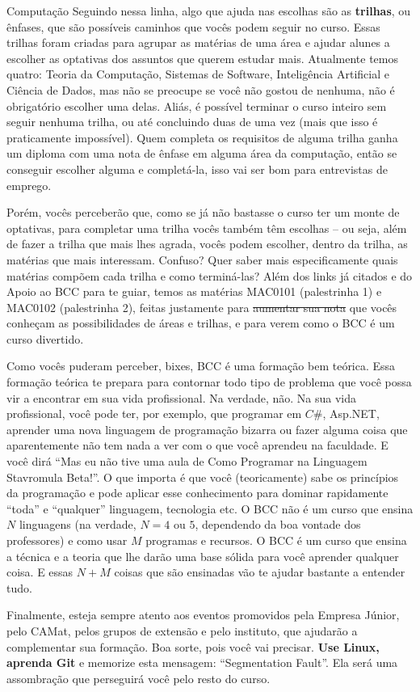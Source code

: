 \begin{subsecao}{Computação}
Seguindo nessa linha, algo que ajuda nas escolhas são as \textbf{trilhas}, ou
ênfases, que são possíveis caminhos que vocês podem seguir no curso. Essas
trilhas foram criadas para agrupar as matérias de uma área e ajudar alunes a
escolher as optativas dos assuntos que querem estudar mais. Atualmente temos
quatro: Teoria da Computação, Sistemas de Software, Inteligência Artificial e
Ciência de Dados, mas não se preocupe se você não gostou de nenhuma, não é
obrigatório escolher uma delas. Aliás, é possível terminar o curso inteiro sem
seguir nenhuma trilha, ou até concluindo duas de uma vez (mais que isso é
praticamente impossível). Quem completa os requisitos de alguma trilha ganha
um diploma com uma nota de ênfase em alguma área da computação, então se
conseguir escolher alguma e completá-la, isso vai ser bom para entrevistas de
emprego.

Porém, vocês perceberão que, como se já não bastasse o curso ter um monte de
optativas, para completar uma trilha vocês também têm escolhas -- ou seja,
além de fazer a trilha que mais lhes agrada, vocês podem escolher, dentro da
trilha, as matérias que mais interessam. Confuso? Quer saber mais
especificamente quais matérias compõem cada trilha e como terminá-las? Além
dos links já citados e do Apoio ao BCC para te guiar, temos as matérias MAC0101
(palestrinha 1) e MAC0102 (palestrinha 2), feitas justamente para
\sout{aumentar sua nota} que vocês conheçam as possibilidades de áreas e
trilhas, e para verem como o BCC é um curso divertido.

Como vocês puderam perceber, bixes, BCC é uma formação bem teórica. Essa
formação teórica te prepara para contornar todo tipo de problema que você
possa vir a encontrar em sua vida profissional. Na verdade, não. Na sua vida
profissional, você pode ter, por exemplo, que programar em $C\#$, Asp.NET,
aprender uma nova linguagem de programação bizarra ou fazer alguma coisa que
aparentemente não tem nada a ver com o que você aprendeu na faculdade. E você
dirá ``Mas eu não tive uma aula de Como Programar na Linguagem Stavromula
Beta!''. O que importa é que você (teoricamente) sabe os princípios da
programação e pode aplicar esse conhecimento para dominar rapidamente ``toda''
e ``qualquer'' linguagem, tecnologia etc. O BCC não é um curso que ensina $N$
linguagens (na verdade, $N = 4$ ou $5$, dependendo da boa vontade dos
professores) e como usar $M$ programas e recursos. O BCC é um curso que ensina
a técnica e a teoria que lhe darão uma base sólida para você aprender qualquer
coisa. E essas $N + M$ coisas que são ensinadas vão te ajudar bastante a
entender tudo.

Finalmente, esteja sempre atento aos eventos promovidos pela Empresa Júnior,
pelo CAMat, pelos grupos de extensão e pelo instituto, que ajudarão a
complementar sua formação. Boa sorte, pois você vai precisar. \textbf{Use
Linux, aprenda Git} e memorize esta mensagem: ``Segmentation Fault''. Ela será
uma assombração que perseguirá você pelo resto do curso.

\end{subsecao}
